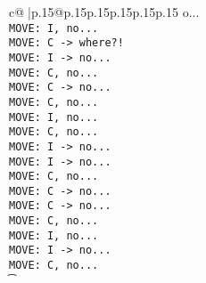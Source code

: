 \documentclass{article}
\begin{document}
{\begin{supertabular}{c@{$\;$}|p{.15\linewidth}@{}p{.15\linewidth}p{.15\linewidth}p{.15\linewidth}p{.15\linewidth}p{.15\linewidth}}
{{{o...\\ \tt  MOVE: I, no...\\ \tt  MOVE: C -> where?!\\ \tt  MOVE: I -> no...\\ \tt  MOVE: C, no...\\ \tt  MOVE: C -> no...\\ \tt  MOVE: C, no...\\ \tt  MOVE: I, no...\\ \tt  MOVE: C, no...\\ \tt  MOVE: I -> no...\\ \tt  MOVE: I -> no...\\ \tt  MOVE: C, no...\\ \tt  MOVE: C -> no...\\ \tt  MOVE: C -> no...\\ \tt  MOVE: C, no...\\ \tt  MOVE: I, no...\\ \tt  MOVE: I -> no...\\ \tt  MOVE: C, no...\\ \t}}}
\end{supertabular}}
\end{document}
